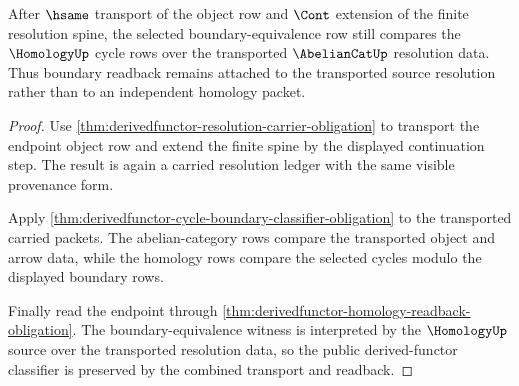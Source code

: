\begin{theorem}\label{thm:derivedfunctor-boundary-over-transported-resolution}
After $\hsame$ transport of the object row and $\Cont$ extension of the finite resolution spine, the selected boundary-equivalence row still compares the $\HomologyUp$ cycle rows over the transported $\AbelianCatUp$ resolution data. Thus boundary readback remains attached to the transported source resolution rather than to an independent homology packet.
\end{theorem}
\begin{proof}
Use \autoref{thm:derivedfunctor-resolution-carrier-obligation} to transport the endpoint object row and extend the finite spine by the displayed continuation step. The result is again a carried resolution ledger with the same visible provenance form.

Apply \autoref{thm:derivedfunctor-cycle-boundary-classifier-obligation} to the transported carried packets. The abelian-category rows compare the transported object and arrow data, while the homology rows compare the selected cycles modulo the displayed boundary rows.

Finally read the endpoint through \autoref{thm:derivedfunctor-homology-readback-obligation}. The boundary-equivalence witness is interpreted by the $\HomologyUp$ source over the transported resolution data, so the public derived-functor classifier is preserved by the combined transport and readback.
\end{proof}

